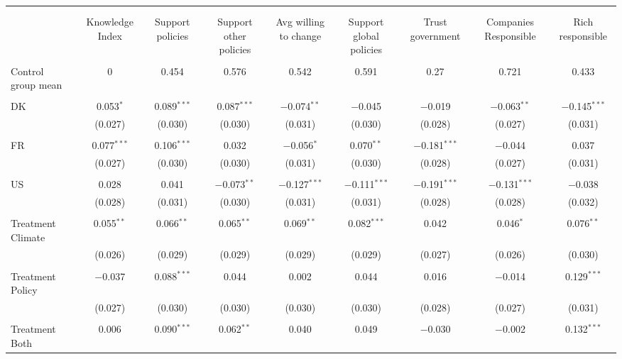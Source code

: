 
\begin{tabular}{@{\extracolsep{5pt}}lcccccccc} 
\\[-1.8ex]\hline 
\hline \\[-1.8ex] 
\\[-1.8ex] & Knowledge Index & Support policies & Support other policies & Avg willing to change & Support global policies & Trust government & Companies Responsible & Rich responsible \\ 
\hline \\[-1.8ex] 
 Control group mean & 0 & 0.454 & 0.576 & 0.542 & 0.591 & 0.27 & 0.721 & 0.433  \\ \hline \\[-1.8ex] DK & 0.053$^{*}$ & 0.089$^{***}$ & 0.087$^{***}$ & $-$0.074$^{**}$ & $-$0.045 & $-$0.019 & $-$0.063$^{**}$ & $-$0.145$^{***}$ \\ 
  & (0.027) & (0.030) & (0.030) & (0.031) & (0.030) & (0.028) & (0.027) & (0.031) \\ 
  & & & & & & & & \\ 
 FR & 0.077$^{***}$ & 0.106$^{***}$ & 0.032 & $-$0.056$^{*}$ & 0.070$^{**}$ & $-$0.181$^{***}$ & $-$0.044 & 0.037 \\ 
  & (0.027) & (0.030) & (0.030) & (0.031) & (0.030) & (0.028) & (0.027) & (0.031) \\ 
  & & & & & & & & \\ 
 US & 0.028 & 0.041 & $-$0.073$^{**}$ & $-$0.127$^{***}$ & $-$0.111$^{***}$ & $-$0.191$^{***}$ & $-$0.131$^{***}$ & $-$0.038 \\ 
  & (0.028) & (0.031) & (0.030) & (0.031) & (0.031) & (0.028) & (0.028) & (0.032) \\ 
  & & & & & & & & \\ 
 Treatment Climate & 0.055$^{**}$ & 0.066$^{**}$ & 0.065$^{**}$ & 0.069$^{**}$ & 0.082$^{***}$ & 0.042 & 0.046$^{*}$ & 0.076$^{**}$ \\ 
  & (0.026) & (0.029) & (0.029) & (0.029) & (0.029) & (0.027) & (0.026) & (0.030) \\ 
  & & & & & & & & \\ 
 Treatment Policy & $-$0.037 & 0.088$^{***}$ & 0.044 & 0.002 & 0.044 & 0.016 & $-$0.014 & 0.129$^{***}$ \\ 
  & (0.027) & (0.030) & (0.030) & (0.030) & (0.030) & (0.028) & (0.027) & (0.031) \\ 
  & & & & & & & & \\ 
 Treatment Both & 0.006 & 0.090$^{***}$ & 0.062$^{**}$ & 0.040 & 0.049 & $-$0.030 & $-$0.002 & 0.132$^{***}$ \\ 

\end{tabular}
